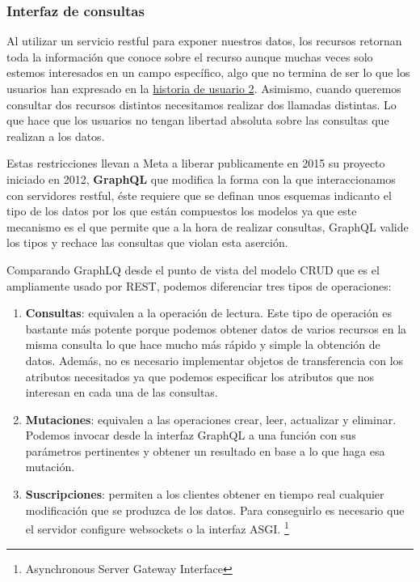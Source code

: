 \subsubsection{Interfaz de consultas}
Al utilizar un servicio restful para exponer nuestros datos, los recursos retornan toda
la información que conoce sobre el recurso aunque muchas veces solo estemos interesados en
un campo específico, algo que no termina de ser lo que los usuarios han expresado en la
\hyperref[sec:hu2]{historia de usuario 2}. Asimismo, cuando queremos consultar dos
recursos distintos necesitamos realizar dos llamadas distintas. Lo que hace que los
usuarios no tengan libertad absoluta sobre las consultas que realizan a los datos.

Estas restricciones llevan a Meta a liberar publicamente en 2015 su proyecto iniciado en 2012,
\textbf{GraphQL} que modifica la forma con la que interaccionamos con servidores restful,
éste requiere que se definan unos esquemas indicanto el tipo de los datos por los que
están compuestos los modelos ya que este mecanismo es el que permite que a la hora de
realizar consultas, GraphQL valide los tipos y rechace las consultas que violan esta
aserción.

Comparando GraphLQ desde el punto de vista del modelo CRUD que es el ampliamente usado por
REST, podemos diferenciar tres tipos de operaciones:
\begin{enumerate}
    \item \textbf{Consultas}: equivalen a la operación de lectura. Este tipo de operación
    es bastante más potente porque podemos obtener datos de varios recursos en la misma
    consulta lo que hace mucho más rápido y simple la obtención de datos. Además, no es
    necesario implementar objetos de transferencia con los atributos necesitados ya que
    podemos especificar los atributos que nos interesan en cada una de las consultas.
    \item \textbf{Mutaciones}: equivalen a las operaciones crear, leer, actualizar y
    eliminar. Podemos invocar desde la interfaz GraphQL a una función con sus parámetros
    pertinentes y obtener un resultado en base a lo que haga esa mutación.
    \item \textbf{Suscripciones}: permiten a los clientes obtener en tiempo real cualquier
    modificación que se produzca de los datos. Para conseguirlo es necesario que el
    servidor configure websockets o la interfaz ASGI. \footnote{Asynchronous Server
    Gateway Interface}
\end{enumerate}

